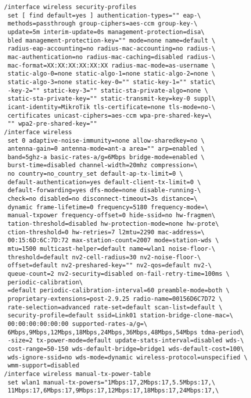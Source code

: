 \begin{verbatim}
/interface wireless security-profiles
 set [ find default=yes ] authentication-types="" eap-\
 methods=passthrough group-ciphers=aes-ccm group-key-\
 update=5m interim-update=0s management-protection=disa\
 bled management-protection-key="" mode=none name=default \
 radius-eap-accounting=no radius-mac-accounting=no radius-\
 mac-authentication=no radius-mac-caching=disabled radius-\
 mac-format=XX:XX:XX:XX:XX:XX radius-mac-mode=as-username \
 static-algo-0=none static-algo-1=none static-algo-2=none \
 static-algo-3=none static-key-0="" static-key-1="" static\
 -key-2="" static-key-3="" static-sta-private-algo=none \
 static-sta-private-key="" static-transmit-key=key-0 suppl\
 icant-identity=MikroTik tls-certificate=none tls-mode=no-\
 certificates unicast-ciphers=aes-ccm wpa-pre-shared-key=\
 "" wpa2-pre-shared-key=""
/interface wireless
 set 0 adaptive-noise-immunity=none allow-sharedkey=no \
 antenna-gain=0 antenna-mode=ant-a area="" arp=enabled \
 band=5ghz-a basic-rates-a/g=6Mbps bridge-mode=enabled \
 burst-time=disabled channel-width=20mhz compression=\
 no country=no_country_set default-ap-tx-limit=0 \
 default-authentication=yes default-client-tx-limit=0 \
 default-forwarding=yes dfs-mode=none disable-running-\
 check=no disabled=no disconnect-timeout=3s distance=\
 dynamic frame-lifetime=0 frequency=5180 frequency-mode=\
 manual-txpower frequency-offset=0 hide-ssid=no hw-fragmen\
 tation-threshold=disabled hw-protection-mode=none hw-prote\
 ction-threshold=0 hw-retries=7 l2mtu=2290 mac-address=\
 00:15:6D:6C:7D:72 max-station-count=2007 mode=station-wds \
 mtu=1500 multicast-helper=default name=wlan1 noise-floor-\
 threshold=default nv2-cell-radius=30 nv2-noise-floor-\
 offset=default nv2-preshared-key="" nv2-qos=default nv2-\
 queue-count=2 nv2-security=disabled on-fail-retry-time=100ms \
 periodic-calibration\
 =default periodic-calibration-interval=60 preamble-mode=both \
 proprietary-extensions=post-2.9.25 radio-name=00156D6C7D72 \
 rate-selection=advanced rate-set=default scan-list=default \
 security-profile=default ssid=Link01 station-bridge-clone-mac=\
 00:00:00:00:00:00 supported-rates-a/g=\
 6Mbps,9Mbps,12Mbps,18Mbps,24Mbps,36Mbps,48Mbps,54Mbps tdma-period\
 -size=2 tx-power-mode=default update-stats-interval=disabled wds-\
 cost-range=50-150 wds-default-bridge=bridge1 wds-default-cost=100\ 
 wds-ignore-ssid=no wds-mode=dynamic wireless-protocol=unspecified \
 wmm-support=disabled
/interface wireless manual-tx-power-table
 set wlan1 manual-tx-powers="1Mbps:17,2Mbps:17,5.5Mbps:17,\
 11Mbps:17,6Mbps:17,9Mbps:17,12Mbps:17,18Mbps:17,24Mbps:17,\

\end{verbatim}
